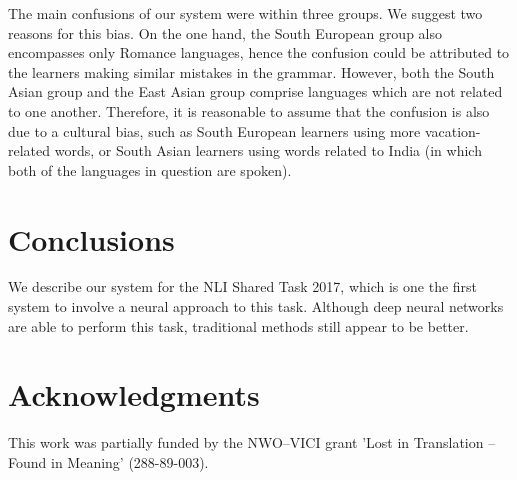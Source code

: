\documentclass[11pt,letterpaper]{article}
\begin{document}
The main confusions of our system were within three groups.
We suggest two reasons for this bias.
On the one hand, the South European group also encompasses only Romance languages, hence the confusion could be attributed to the learners making similar mistakes in the grammar.
However, both the South Asian group and the East Asian group comprise languages which are not related to one another.
Therefore, it is reasonable to assume that the confusion is also due to a cultural bias, such as South European learners using more vacation-related words, or South Asian learners using words related to India (in which both of the languages in question are spoken).

\section{Conclusions}
We describe our system for the NLI Shared Task 2017, which is one the first system to involve a neural approach to this task.
Although deep neural networks are able to perform this task, traditional methods still appear to be better.

\section*{Acknowledgments}
This work was partially funded by the NWO--VICI grant 'Lost in Translation -- Found in Meaning' (288-89-003).




\end{document}
